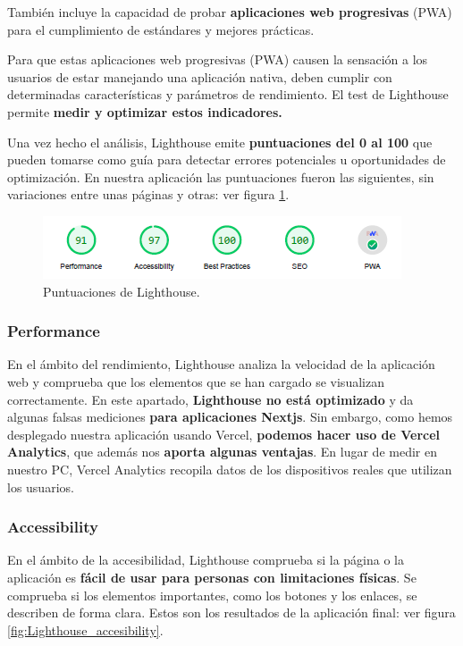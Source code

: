\documentclass[12pt,twoside,titlepage]{report}
\begin{document}
También incluye la capacidad de probar \textbf{aplicaciones web progresivas} (PWA) para el cumplimiento de estándares y mejores prácticas.

Para que estas aplicaciones web progresivas (PWA) causen la sensación a los usuarios de estar manejando una aplicación nativa, deben cumplir con determinadas características y parámetros de rendimiento. El test de Lighthouse permite \textbf{medir y optimizar estos indicadores.}

Una vez hecho el análisis, Lighthouse emite \textbf{puntuaciones del 0 al 100} que pueden tomarse como guía para detectar errores potenciales u oportunidades de optimización. En nuestra aplicación las puntuaciones fueron las siguientes, sin variaciones entre unas páginas y otras: ver figura \ref{fig:Lighthouse_resumen}.

\begin{figure}[H]
    \centering
    \includegraphics[scale=1.2]{Lighthouse/Resumen}
    \caption{Puntuaciones de Lighthouse.}
    \label{fig:Lighthouse_resumen}
\end{figure}

\subsubsection{Performance}

En el ámbito del rendimiento, Lighthouse analiza la velocidad de la aplicación web y comprueba que los elementos que se han cargado se visualizan correctamente. En este apartado, \textbf{Lighthouse no está optimizado} y da algunas falsas mediciones \textbf{para aplicaciones Nextjs}. Sin embargo, como hemos desplegado nuestra aplicación usando Vercel, \textbf{podemos hacer uso de Vercel Analytics}, que además nos \textbf{aporta algunas ventajas}. En lugar de medir en nuestro PC, Vercel Analytics recopila datos de los dispositivos reales que utilizan los usuarios. 

\subsubsection{Accessibility}

En el ámbito de la accesibilidad, Lighthouse comprueba si la página o la aplicación es \textbf{fácil de usar para personas con limitaciones físicas}. Se comprueba si los elementos importantes, como los botones y los enlaces, se describen de forma clara. Estos son los resultados de la aplicación final: ver figura \ref{fig:Lighthouse_accesibility}.
\end{document}
